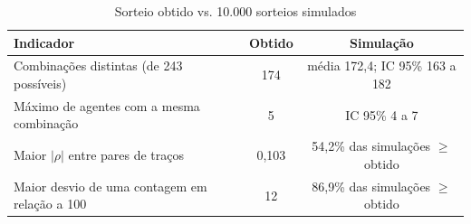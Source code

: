 \begin{table}[htb]
    \caption{Sorteio obtido vs. 10.000 sorteios simulados}
    \label{tab:aleat-montecarlo}
    \centering
    \footnotesize
    \begin{tabular}{lcc}
        \toprule
        Indicador & Obtido & Simulação \\
        \midrule
        Combinações distintas (de 243 possíveis) & 174 & média 172,4; IC 95\% 163 a 182 \\
        Máximo de agentes com a mesma combinação & 5 & IC 95\% 4 a 7 \\
        Maior $|\rho|$ entre pares de traços & 0,103 & 54,2\% das simulações $\geq$ obtido \\
        Maior desvio de uma contagem em relação a 100 & 12 & 86,9\% das simulações $\geq$ obtido \\
        \bottomrule
    \end{tabular}
\end{table}
